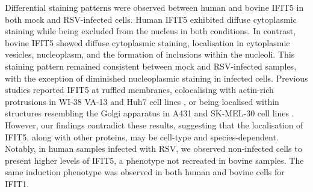 Differential staining patterns were observed between human and bovine IFIT5 in both mock and RSV-infected cells. Human IFIT5 exhibited diffuse cytoplasmic staining while being excluded from the nucleus in both conditions. In contrast, bovine IFIT5 showed diffuse cytoplasmic staining, localisation in cytoplasmic vesicles, nucleoplasm, and the formation of inclusions within the nucleoli. This staining pattern remained consistent between mock and RSV-infected samples, with the exception of diminished nucleoplasmic staining in infected cells. Previous studies reported IFIT5 at ruffled membranes, colocalising with actin-rich protrusions in WI-38 VA-13 and Huh7 cell lines \cite{Katibah2013TRNAIFIT5}, or being localised within structures resembling the Golgi apparatus in A431 and SK-MEL-30 cell lines \cite{Thul2017AProteome}. However, our findings contradict these results, suggesting that the localisation of IFIT5, along with other proteins, may be cell-type and species-dependent. Notably, in human samples infected with RSV, we observed non-infected cells to present higher levels of IFIT5, a phenotype not recreated in bovine samples. The same induction phenotype was observed in both human and bovine cells for IFIT1.

